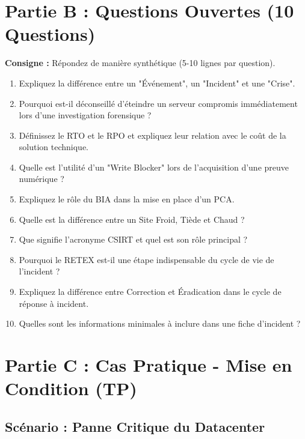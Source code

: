 \section{Partie B : Questions Ouvertes (10 Questions)}

\textbf{Consigne :} Répondez de manière synthétique (5-10 lignes par question).

\begin{enumerate}
    \item Expliquez la différence entre un "Événement", un "Incident" et une "Crise".
    \item Pourquoi est-il déconseillé d'éteindre un serveur compromis immédiatement lors d'une investigation forensique ?
    \item Définissez le RTO et le RPO et expliquez leur relation avec le coût de la solution technique.
    \item Quelle est l'utilité d'un "Write Blocker" lors de l'acquisition d'une preuve numérique ?
    \item Expliquez le rôle du BIA dans la mise en place d'un PCA.
    \item Quelle est la différence entre un Site Froid, Tiède et Chaud ?
    \item Que signifie l'acronyme CSIRT et quel est son rôle principal ?
    \item Pourquoi le RETEX est-il une étape indispensable du cycle de vie de l'incident ?
    \item Expliquez la différence entre Correction et Éradication dans le cycle de réponse à incident.
    \item Quelles sont les informations minimales à inclure dans une fiche d'incident ?
\end{enumerate}

\section{Partie C : Cas Pratique - Mise en Condition (TP)}

\subsection{Scénario : Panne Critique du Datacenter}

